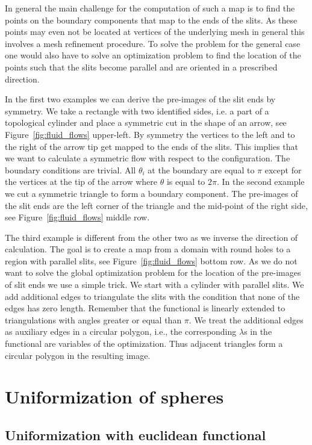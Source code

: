 \documentclass[Thesis]{subfiles}
\begin{document}
In general the main challenge for the computation of such a map is to find the points on the boundary components that map to the ends of the slits. As these points may even not be located at vertices of the underlying mesh in general this involves a mesh refinement procedure. To solve the problem for the general case one would also have to solve an optimization problem to find the location of the points such that the slits become parallel and are oriented in a prescribed direction.

In the first two examples we can derive the pre-images of the slit ends by symmetry. 
We take a rectangle with two identified sides, i.e. a part of a topological cylinder and place a symmetric cut in the shape of an arrow, see Figure~\ref{fig:fluid_flows} upper-left. 
By symmetry the vertices to the left and to the right of the arrow tip get mapped to the ends of the slits. 
This implies that we want to calculate a symmetric flow with respect to the configuration.
The boundary conditions are trivial. 
All $\theta_i$ at the boundary are equal to $\pi$ except for the vertices at the tip of the arrow where $\theta$ is equal to $2\pi$.
In the second example we cut a symmetric triangle to form a boundary component. The pre-images of the slit ends are the left corner of the triangle and the mid-point of the right side, see Figure~\ref{fig:fluid_flows} middle row.

The third example is different from the other two as we inverse the direction of calculation. 
The goal is to create a map from a domain with round holes to a region with parallel slits, see Figure~\ref{fig:fluid_flows} bottom row. 
As we do not want to solve the global optimization problem for the location of the pre-images of slit ends we use a simple trick.
We start with a cylinder with parallel slits.
We add additional edges to triangulate the slits with the condition that none of the edges has zero length.
Remember that the functional is linearly extended to triangulations with angles greater or equal than $\pi$.
We treat the additional edges as auxiliary edges in a circular polygon, i.e., the corresponding $\lambda$s in the functional are variables of the optimization. 
Thus adjacent triangles form a circular polygon in the resulting image.

\section{Uniformization of spheres}
\subsection{Uniformization with euclidean functional}
\label{sec:spheres_euclidean}
\end{document}
